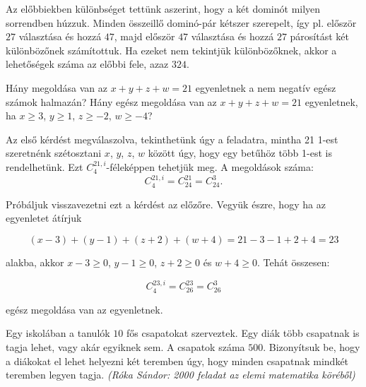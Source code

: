 \begin{solution}
\begin{enumerate}
Az előbbiekben különbséget tettünk aszerint, hogy a két dominót milyen
sorrendben húzzuk. Minden összeillő dominó-pár kétszer szerepelt,
így pl. először $27$ választása és hozzá $47$, majd először $47$
választása és hozzá $27$ párosítást két különbözőnek számítottuk.
Ha ezeket nem tekintjük különbözőknek, akkor a lehetőségek száma az
előbbi fele, azaz $324$. 
\end{enumerate}
\end{solution}

\begin{extraproblem}
Hány megoldása van az $x+y+z+w=21$ egyenletnek a nem negatív egész
számok halmazán? Hány egész megoldása van az $x+y+z+w=21$ egyenletnek,
ha $x\geq3$, $y\geq1$, $z\geq-2$, $w\geq-4$?
\end{extraproblem}

\begin{solution}
Az első kérdést megválaszolva, tekinthetünk úgy a feladatra, mintha
21 1-est szeretnénk szétosztani $x$, $y$, $z$, $w$ között úgy,
hogy egy betűhöz több 1-est is rendelhetünk. Ezt $C_{4}^{21,i}$-féleképpen
tehetjük meg. A megoldások száma: 
\[
C_{4}^{21,i}=C_{24}^{21}=C_{24}^{3}.
\]

Próbáljuk visszavezetni ezt a kérdést az előzőre. Vegyük észre, hogy
ha az egyenletet átírjuk

\[
(x-3)+(y-1)+(z+2)+(w+4)=21-3-1+2+4=23
\]

alakba, akkor $x-3\geq0$, $y-1\geq0$, $z+2\geq0$ és $w+4\geq0$.
Tehát összesen:

\[
C_{4}^{23,i}=C_{26}^{23}=C_{26}^{3}
\]

egész megoldása van az egyenletnek.
\end{solution}
\begin{extraproblem}
Egy iskolában a tanulók $10$ fős csapatokat szerveztek. Egy diák
több csapatnak is tagja lehet, vagy akár egyiknek sem. A csapatok
száma $500$. Bizonyítsuk be, hogy a diákokat el lehet helyezni két
teremben úgy, hogy minden csapatnak mindkét teremben legyen tagja.
\emph{(Róka Sándor: 2000 feladat az elemi matematika köréből) }
\end{extraproblem}

